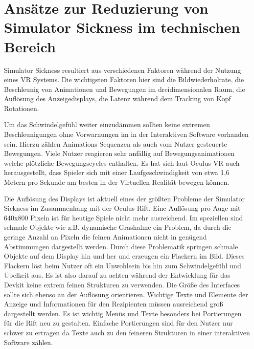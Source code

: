 \documentclass[pagesize, paper=a4, fontsize=12pt,titlepage=true, headings=small, headnosepline, abstractoff, liststotoc, nochapterprefix, plainheadsepline]{scrreprt}
\begin{document}
\section{Ansätze zur Reduzierung von Simulator Sickness im technischen Bereich}
Simulator Sickness resultiert aus verschiedenen Faktoren während der Nutzung eines VR Systems. Die wichtigsten Faktoren hier sind die Bildwiederholrate, die Beschleunig von Animationen und Bewegungen im dreidimensionalen Raum, die Auflösung des Anzeigedisplays, die Latenz während dem Tracking von Kopf Rotationen. 

Um das Schwindelgefühl weiter einzudämmen sollten keine extremen Beschleunigungen ohne Vorwarnungen im in der Interaktiven Software vorhanden sein. Hierzu zählen Animations Sequenzen als auch vom Nutzer gesteuerte Bewegungen. Viele Nutzer reagieren sehr anfällig auf Bewegungsanimationen welche plötzliche Bewegungscycles enthalten. Es hat sich laut Oculus VR auch herausgestellt, dass Spieler sich mit einer Laufgeschwindigkeit von etwa 1,6 Metern pro Sekunde am besten in der Virtuellen Realität bewegen können.

Die Auflösung des Displays ist aktuell eines der größten Probleme der Simulator Sickness im Zusammenhang mit der Oculus Rift.  Eine Auflösung pro Auge mit 640x800 Pixeln ist für heutige Spiele nicht mehr ausreichend. Im speziellen sind schmale Objekte wie z.B. dynamische Grashalme ein Problem, da durch die geringe Anzahl an Pixeln die feinen Animationen nicht in genügend Abstimmungen dargestellt werden. Durch diese Problematik springen schmale Objekte auf dem Display hin und her und erzeugen ein Flackern im Bild. Dieses Flackern löst beim Nutzer oft ein Unwohlsein bis hin zum Schwindelgefühl und Übelkeit aus. Es ist also darauf zu achten während der Entwicklung für das Devkit keine extrem feinen Strukturen zu verwenden. Die Größe des Interfaces sollte sich ebenso an der Auflösung orientieren. Wichtige Texte und Elemente der Anzeige und Informationen für den Rezipienten müssen ausreichend groß dargestellt werden. Es ist wichtig Menüs und Texte besonders bei Portierungen für die Rift neu zu gestalten. Einfache Portierungen sind für den Nutzer nur schwer zu ertragen da Texte auch zu den feineren Strukturen in einer interaktiven Software zählen.
\end{document}
